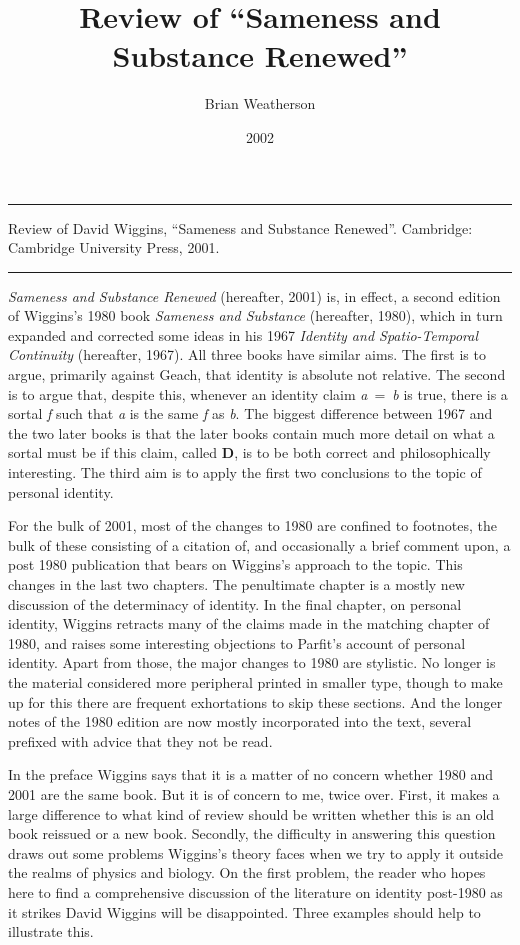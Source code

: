 \documentclass[
  10pt,
  letterpaper,
  DIV=11,
  numbers=noendperiod,
  twoside]{scrartcl}
\title{Review of ``Sameness and Substance Renewed''}
\author{Brian Weatherson}
\date{2002}
\renewenvironment{abstract}
 {\vspace{-1.25cm}
 \quotation\small\noindent\rule{\linewidth}{.5pt}\par\smallskip
 \noindent }
 {\par\noindent\rule{\linewidth}{.5pt}\endquotation}
\begin{document}
\maketitle
\begin{abstract}
Review of David Wiggins, ``Sameness and Substance Renewed''. Cambridge:
Cambridge University Press, 2001.
\end{abstract}

\emph{Sameness and Substance Renewed} (hereafter, 2001) is, in effect, a
second edition of Wiggins's 1980 book \emph{Sameness and Substance}
(hereafter, 1980), which in turn expanded and corrected some ideas in
his 1967 \emph{Identity and Spatio-Temporal Continuity} (hereafter,
1967). All three books have similar aims. The first is to argue,
primarily against Geach, that identity is absolute not relative. The
second is to argue that, despite this, whenever an identity claim
\emph{a}~=~\emph{b} is true, there is a sortal \emph{f} such that
\emph{a} is the same \emph{f} as \emph{b}. The biggest difference
between 1967 and the two later books is that the later books contain
much more detail on what a sortal must be if this claim, called
\textbf{D}, is to be both correct and philosophically interesting. The
third aim is to apply the first two conclusions to the topic of personal
identity.

For the bulk of 2001, most of the changes to 1980 are confined to
footnotes, the bulk of these consisting of a citation of, and
occasionally a brief comment upon, a post 1980 publication that bears on
Wiggins's approach to the topic. This changes in the last two chapters.
The penultimate chapter is a mostly new discussion of the determinacy of
identity. In the final chapter, on personal identity, Wiggins retracts
many of the claims made in the matching chapter of 1980, and raises some
interesting objections to Parfit's account of personal identity. Apart
from those, the major changes to 1980 are stylistic. No longer is the
material considered more peripheral printed in smaller type, though to
make up for this there are frequent exhortations to skip these sections.
And the longer notes of the 1980 edition are now mostly incorporated
into the text, several prefixed with advice that they not be read.

In the preface Wiggins says that it is a matter of no concern whether
1980 and 2001 are the same book. But it is of concern to me, twice over.
First, it makes a large difference to what kind of review should be
written whether this is an old book reissued or a new book. Secondly,
the difficulty in answering this question draws out some problems
Wiggins's theory faces when we try to apply it outside the realms of
physics and biology. On the first problem, the reader who hopes here to
find a comprehensive discussion of the literature on identity post-1980
as it strikes David Wiggins will be disappointed. Three examples should
help to illustrate this.
\end{document}
